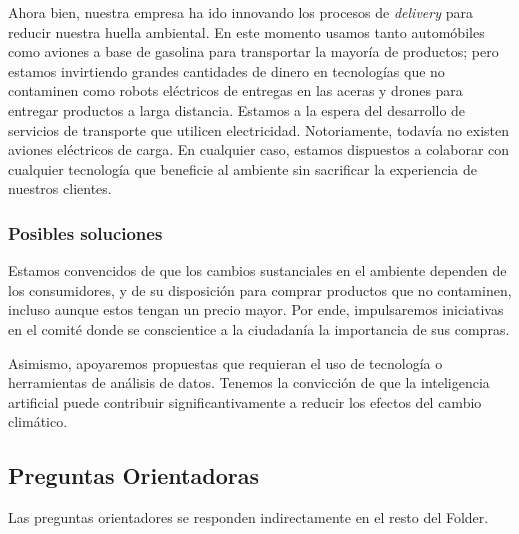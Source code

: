 \documentclass[11pt,a4paper]{article}
\begin{document}
Ahora bien, nuestra empresa ha ido innovando los procesos de \textit{delivery} para reducir nuestra huella ambiental. En este momento usamos tanto automóbiles como aviones a base de gasolina para transportar la mayoría de productos; pero estamos invirtiendo grandes cantidades de dinero en tecnologías que no contaminen como robots eléctricos de entregas en las aceras y drones para entregar productos a larga distancia. Estamos a la espera del desarrollo de servicios de transporte que utilicen electricidad. Notoriamente, todavía no existen aviones eléctricos de carga. En cualquier caso, estamos dispuestos a colaborar con cualquier tecnología que beneficie al ambiente sin sacrificar la experiencia de nuestros clientes. 

\subsubsection{Posibles soluciones}

\noindent Estamos convencidos de que los cambios sustanciales en el ambiente dependen de los consumidores, y de su disposición para comprar productos que no contaminen, incluso aunque estos tengan un precio mayor. Por ende, impulsaremos iniciativas en el comité donde se conscientice a la ciudadanía la importancia de sus compras. 

Asimismo, apoyaremos propuestas que requieran el uso de tecnología o herramientas de análisis de datos. Tenemos la convicción de que la inteligencia artificial puede contribuir significantivamente a reducir los efectos del cambio climático.

\subsection{Preguntas Orientadoras }

\noindent Las preguntas orientadores se responden indirectamente en el resto del Folder.








































































\end{document}
